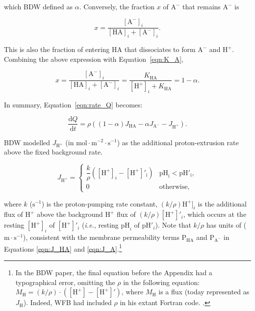 \documentclass[fleqn,10pt]{physiome}
\begin{document}
which BDW defined as $\alpha$. Conversely, the fraction $x$ of $\mathrm{A^-}$ that remains $\mathrm{A^-}$ is

\begin{equation}
x=\dfrac{\mathrm{[A^-]}_i}{\mathrm{[HA]}_i+\mathrm{[A^-]}_i}.
\end{equation}

This is also the fraction of entering HA that dissociates to form $\mathrm{A^-}$ and $\mathrm{H^+}$. Combining the above expression with Equation~\ref{eqn:K_A},

\begin{equation}
x=\dfrac{\mathrm{[A^-]}_i}{\mathrm{[HA]}_i+\mathrm{[A^-]}_i}=\dfrac{K_\mathrm{HA}}{\mathrm{[H^+]}_i+K_\mathrm{HA}}=1-\alpha.
\label{eqn:y2}
\end{equation}

In summary, Equation~\ref{eqn:rate_Q} becomes:

\begin{equation}
\dfrac{\mathrm{d}Q}{\mathrm{d}t}=\rho\left((1-\alpha)J_\mathrm{HA}-\alpha J_\mathrm{A^-}-J_\mathrm{H^+}\right).
\label{eqn:Q_rate2}
\end{equation}

BDW modelled $J_\mathrm{H^+}$ (in $\mathrm{mol\cdot m^{-2}\cdot s^{-1}}$) as the additional proton-extrusion rate above the fixed background rate. 

\begin{equation}
J_\mathrm{H^+}= 
\begin{cases}
  \dfrac{k}{\rho}\left(\mathrm{[H^+]}_i-\mathrm{[H^+]'_i}\right)  & \mathrm{{pH}_i} < \mathrm{{pH}'_i}, \\
  0  & \mathrm{otherwise},
\end{cases}
\label{eqn:pump}
\end{equation}

where $k$ ($\mathrm{s^{-1}}$) is the proton-pumping rate constant, $(k/\rho)\mathrm{H^+}]_i$ is the additional flux of $\mathrm{H^+}$ above the background $\mathrm{H^+}$ flux of $(k/\rho)[\mathrm{H^+}]'_i$, which occurs at the resting $[\mathrm{H^+}]_i$ of $[\mathrm{H^+}]'_i$ (\emph{i.e.}, resting $\mathrm{pH}_i$ of $\mathrm{pH}'_i$). Note that $k/\rho$ has units of ($\mathrm{m\cdot s^{-1}}$), consistent with the membrane permeability terms $\mathrm{P_{HA}}$ and $\mathrm{P_{A^-}}$ in Equations \ref{eqn:J_HA} and \ref{eqn:J_A}.\footnote{In the BDW paper, the final equation before the Appendix had a typographical error, omitting the $\rho$ in the following equation: $M_\mathrm{H} = (k/\rho)\cdot (\mathrm{[H^+]}-\mathrm{[H^+]}')$, where $M_\mathrm{H}$ is a flux (today represented as $J_\mathrm{H}$). Indeed, WFB had included $\rho$ in his extant Fortran code.
.}\\
\end{document}
